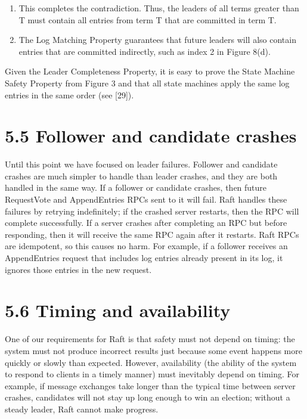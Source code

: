 \documentclass[
]{article}
\providecommand{\tightlist}{%
  \setlength{\itemsep}{0pt}\setlength{\parskip}{0pt}}
\begin{document}
\begin{enumerate}
\def\labelenumi{\arabic{enumi}.}
\setcounter{enumi}{7}
\tightlist
\item
  This completes the contradiction. Thus, the leaders of all terms
  greater than T must contain all entries from term T that are committed
  in term T.\\
\item
  The Log Matching Property guarantees that future leaders will also
  contain entries that are committed indirectly, such as index 2 in
  Figure 8(d).
\end{enumerate}

Given the Leader Completeness Property, it is easy to prove the State
Machine Safety Property from Figure 3 and that all state machines apply
the same log entries in the same order (see {[}29{]}).

\section{5.5 Follower and candidate
crashes}\label{follower-and-candidate-crashes}

Until this point we have focused on leader failures. Follower and
candidate crashes are much simpler to handle than leader crashes, and
they are both handled in the same way. If a follower or candidate
crashes, then future RequestVote and AppendEntries RPCs sent to it will
fail. Raft handles these failures by retrying indefinitely; if the
crashed server restarts, then the RPC will complete successfully. If a
server crashes after completing an RPC but before responding, then it
will receive the same RPC again after it restarts. Raft RPCs are
idempotent, so this causes no harm. For example, if a follower receives
an AppendEntries request that includes log entries already present in
its log, it ignores those entries in the new request.

\section{5.6 Timing and availability}\label{timing-and-availability}

One of our requirements for Raft is that safety must not depend on
timing: the system must not produce incorrect results just because some
event happens more quickly or slowly than expected. However,
availability (the ability of the system to respond to clients in a
timely manner) must inevitably depend on timing. For example, if message
exchanges take longer than the typical time between server crashes,
candidates will not stay up long enough to win an election; without a
steady leader, Raft cannot make progress.
\end{document}
